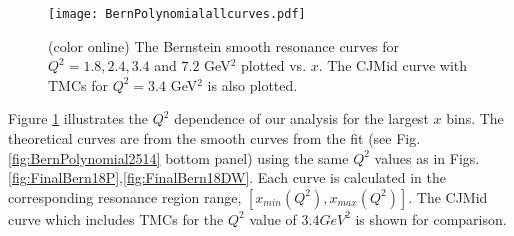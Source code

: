 \documentclass[
twocolumn,
aps,prd,
nofootinbib,
superscriptaddress,
showpacs,ligh
tightenlines, 
]{revtex4}
\begin{document}
\begin{figure}
\texttt{[image: BernPolynomialallcurves.pdf]}
\caption{(color online) The Bernstein smooth resonance curves for $Q^{2}= 1.8, 2.4, 3.4$ and $7.2$ {GeV}$^{2}$ plotted vs. $x$.  The CJMid curve with TMCs \cite{Accardi:2011} \cite{Buckley:2014ana} for $Q^{2} = 3.4$ {GeV}$^{2}$ is also plotted.}
\label{fig:BernPol}
\end{figure}
Figure \ref{fig:BernPol} 
illustrates the $Q^2$ dependence of our analysis for the largest $x$ bins. 
The theoretical curves are from the smooth curves from the fit (see Fig.\ref{fig:BernPolynomial2514} bottom panel) using the same $Q^{2}$ values as in Figs.\ref{fig:FinalBern18P},\ref{fig:FinalBern18DW}. Each curve is calculated in the corresponding resonance region range, $[x_{min}(Q^2), x_{max}(Q^2)]$.   The CJMid curve which includes TMCs \cite{Accardi:2011} for the $Q^{2}$ value of $3.4 {GeV}^{2}$ is shown for comparison. 
\end{document}
